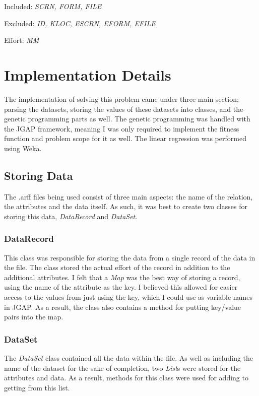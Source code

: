\documentclass[11pt, a4paper]{article}
\begin{document}
Included: \emph{SCRN, FORM, FILE}

Excluded: \emph{ID, KLOC, ESCRN, EFORM, EFILE}

Effort: \emph{MM}

\section{Implementation Details} %
\label{sec:implementation_details}
The implementation of solving this problem came under three main section;
parsing the datasets, storing the values of these datasets into classes, and the
genetic programming parts as well. The genetic programming was handled with the
JGAP framework, meaning I was only required to implement the fitness function
and problem scope for it as well. The linear regression was performed using
Weka.

\subsection{Storing Data} %
\label{sub:storing_data}
The .arff files being used consist of three main aspects: the name of the
relation, the attributes and the data itself. As such, it was best to create two
classes for storing this data, \emph{DataRecord} and \emph{DataSet}.

\subsubsection{DataRecord} %
\label{ssub:datarecord}
This class was responsible for storing the data from a single record of the data
in the file. The class stored the actual effort of the record in addition to the
additional attributes. I felt that a \emph{Map} was the best way of storing a
record, using the name of the attribute as the key. I believed this allowed for
easier access to the values from just using the key, which I could use as
variable names in JGAP. As a result, the class also contains a method for
putting key/value pairs into the map.

\subsubsection{DataSet} %
\label{ssub:dataset}
The \emph{DataSet} class contained all the data within the file. As well as
including the name of the dataset for the sake of completion, two \emph{List}s
were stored for the attributes and data. As a result, methods for this class
were used for adding to getting from this list.
\end{document}
